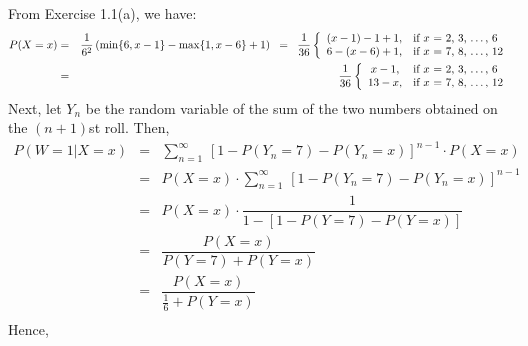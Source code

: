 From Exercise 1.1(a), we have:
\begin{eqnarray*}
P(X = x)
& = &
\dfrac{1}{6^{2}}\left( \min\{6,x-1\} - \max\{1,x-6\} + 1 \right) 
\;\; = \;\;
\dfrac{1}{36}\left\{\begin{array}{cl}
(x-1) - 1 + 1  , & \textnormal{if $x$ = 2, 3, \ldots,  6} \\
6 - (x - 6) + 1, & \textnormal{if $x$ = 7, 8, \ldots, 12} \\
\end{array}\right.
\\
& = &
\dfrac{1}{36}\left\{\begin{array}{cl}
 x - 1, & \textnormal{if $x$ = 2, 3, \ldots,  6} \\
13 - x, & \textnormal{if $x$ = 7, 8, \ldots, 12} \\
\end{array}\right.
\end{eqnarray*}
Next, let $Y_{n}$ be the random variable of the sum of the two numbers obtained on the
$(n+1)$st roll.  Then,
\begin{eqnarray*}
P(W = 1 \vert X = x)
& = &
\sum_{n=1}^{\infty}\,\left[1 - P(Y_{n} = 7) - P(Y_{n} = x)\right]^{n-1} \cdot P(X = x) \\
& = &
P(X = x) \cdot \sum_{n=1}^{\infty}\,\left[1 - P(Y_{n} = 7) - P(Y_{n} = x)\right]^{n-1} \\
& = &
P(X = x) \cdot \dfrac{1}{1 - \left[1 - P(Y = 7) - P(Y = x)\right]} \\
& = &
\dfrac{P(X = x)}{P(Y = 7) + P(Y = x)} \\
& = &
\dfrac{P(X = x)}{\frac{1}{6} + P(Y = x)} \\
\end{eqnarray*}
Hence,
